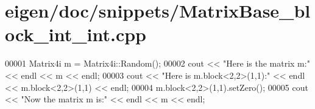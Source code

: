 \hypertarget{eigen_2doc_2snippets_2_matrix_base__block__int__int_8cpp_source}{}\section{eigen/doc/snippets/\+Matrix\+Base\+\_\+block\+\_\+int\+\_\+int.cpp}
\label{eigen_2doc_2snippets_2_matrix_base__block__int__int_8cpp_source}

\begin{DoxyCode}
00001 Matrix4i m = Matrix4i::Random();
00002 cout << \textcolor{stringliteral}{"Here is the matrix m:"} << endl << m << endl;
00003 cout << \textcolor{stringliteral}{"Here is m.block<2,2>(1,1):"} << endl << m.block<2,2>(1,1) << endl;
00004 m.block<2,2>(1,1).setZero();
00005 cout << \textcolor{stringliteral}{"Now the matrix m is:"} << endl << m << endl;
\end{DoxyCode}
